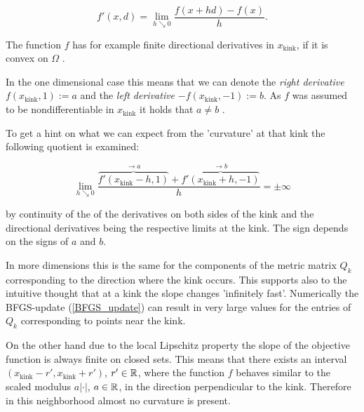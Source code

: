 \[ f'(x,d) = \lim_{h \searrow 0} \frac{f(x+h d)-f(x)}{h}. \]

The function \(f\) has for example finite directional derivatives in \(x_{\text{kink}}\), if it is convex on \(\Omega\) \cite[p. 144]{Stoer1970}.

In the one dimensional case this means that we can denote the \emph{right derivative} \(f(x_{\text{kink}},1) := a\) and the \emph{left derivative} \(-f(x_{\text{kink}},-1) := b\). As \(f\) was assumed to be nondifferentiable in \(x_{\text{kink}}\) it holds that \(a \neq b\) \cite[p. 213]{Rockafellar1970}.



To get a hint on what we can expect from the 'curvature' at that kink the following quotient is examined:


\[ \lim_{h \searrow 0} \frac{\overbrace{f'(x_{\text{kink}}-h,1)}^{\to a}+\overbrace{f'(x_{\text{kink}}+h,-1)}^{\to b}}{h} = \pm \infty \]

by continuity of the of the derivatives on both sides of the kink and the directional derivatives being the respective limits at the kink.
The sign depends on the signs of \(a\) and \(b\). 

In more dimensions this is the same for the components of the metric matrix \(Q_k\) corresponding to the direction where the kink occurs. This supports also to the intuitive thought that at a kink the slope changes 'infinitely fast'.
Numerically the BFGS-update (\ref{BFGS_update}) can result in very large values for the entries of \(Q_k\) corresponding to points near the kink.

On the other hand due to the local Lipschitz property the slope of the objective function is always finite on closed sets. This means that there exists an interval \((x_{\text{kink}}-r',x_{\text{kink}}+r')\), \(r' \in \mathbb{R}\), where the function \(f\) behaves similar to the scaled modulus \(a|\cdot|\), \(a \in \mathbb{R}\), in the direction perpendicular to the kink. Therefore in this neighborhood almost no curvature is present.

